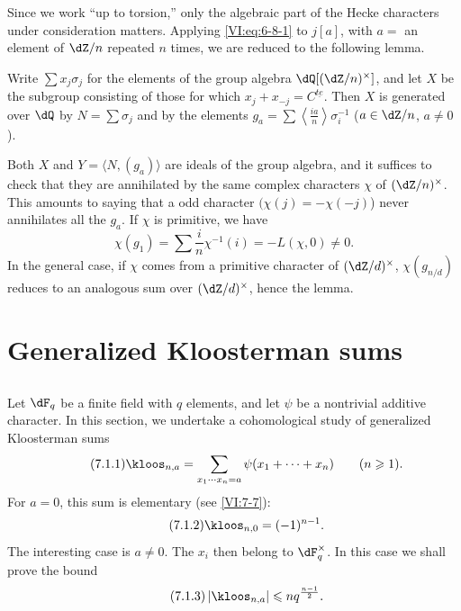 \documentclass[oneside]{book}
\begin{document}
Since we work ``up to torsion,'' only the algebraic part of the 
Hecke characters under consideration matters. Applying \eqref{VI:eq:6-8-1} to 
$j[a]$, with $a=$ an element of $\dZ/n$ repeated $n$ times, we 
are reduced to the following lemma.





\begin{lemma_}\label{VI:6-12}
Write $\sum x_j \sigma_j$ for the elements of the group algebra 
  $\dQ[(\dZ/n)^\times]$, and let $X$ be the subgroup consisting of those for which 
$x_j+x_{-j}=C^{\underline{t e}}$. Then $X$ is generated over $\dQ$ by 
$N=\sum \sigma_j$ and by the elements 
  $g_a=\sum \left\langle \frac{i a}{n}\right\rangle \sigma_i^{-1}$ 
($a\in \dZ/n$, $a\ne 0$). 
\end{lemma_}

Both $X$ and $Y=\langle N,(g_a)\rangle$ are ideals of the group 
algebra, and it suffices to check that they are annihilated by the same 
complex characters $\chi$ of $(\dZ/n)^\times$. This amounts to saying that a 
odd character $(\chi(j)=-\chi(-j)$) never annihilates all the $g_a$. If 
$\chi$ is primitive, we have 
\[
  \chi(g_1) = \sum \frac i n \chi^{-1}(i) = -L(\chi,0)\ne 0 \text{.} 
\]
In the general case, if $\chi$ comes from a primitive character of 
  $(\dZ/d)^\times$, $\chi(g_{n/d})$ reduces to an analogous sum over 
  $(\dZ/d)^\times$, hence the lemma. 










\section{Generalized Kloosterman sums}\label{VI:7}





\subsection{}\label{VI:7-1}

Let $\dF_q$ be a finite field with $q$ elements, and let $\psi$ be a nontrivial 
additive character. In this section, we undertake a cohomological study of 
generalized Kloosterman sums 
\begin{equation*}\tag{7.1.1}\label{VI:eq:7-1-1}
  \kloos_{n,a} = \sum_{x_1\dotsm x_n = a} \psi(x_1+\cdots + x_n) \qquad (n\geqslant 1) \text{.} 
\end{equation*}
For $a=0$, this sum is elementary (see \ref{VI:7-7}): 
\begin{equation*}\tag{7.1.2}\label{VI:eq:7-1-2}
  \kloos_{n,0} = (-1)^{n-1} \text{.} 
\end{equation*}
The interesting case is $a\ne 0$. The $x_i$ then belong to 
$\dF_q^\times$. In this case we shall prove the bound 
\begin{equation*}\tag{7.1.3}\label{VI:eq:7-1-3}
  \left|\kloos_{n,a}\right| \leqslant n q^{\frac{n-1}{2}} \text{.} 
\end{equation*}
\end{document}
